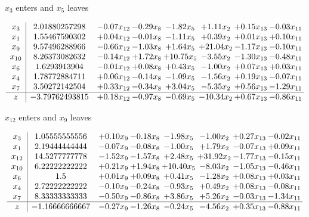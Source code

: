 \documentclass[9pt]{article}
\begin{document}
 $ x_{3} $ enters and $ x_{5} $ leaves 

 \[\begin{array}{c| c c@{\hskip 2pt} c@{\hskip 2pt} c@{\hskip 2pt} c@{\hskip 2pt} c@{\hskip 2pt} c@{\hskip 2pt} }
 x_{3}   &  2.01880257298 & -0.07 x_{12} & -0.29 x_{8} & -1.82 x_{5} & +  1.11 x_{2} & +  0.15 x_{13} & -0.03 x_{11}\\
 x_{1}   &  1.55467590302 & +  0.04 x_{12} & -0.01 x_{8} & -1.11 x_{5} & +  0.39 x_{2} & +  0.01 x_{13} & +  0.10 x_{11}\\
 x_{9}   &  9.57496288966 & -0.66 x_{12} & -1.03 x_{8} & +  1.64 x_{5} & + 21.04 x_{2} & -1.17 x_{13} & -0.10 x_{11}\\
 x_{10}   &  8.26373082632 & -0.14 x_{12} & +  1.72 x_{8} & + 10.75 x_{5} & -3.55 x_{2} & -1.30 x_{13} & -0.48 x_{11}\\
 x_{6}   &  1.6293913904 & -0.01 x_{12} & +  0.08 x_{8} & +  0.43 x_{5} & -1.00 x_{2} & +  0.07 x_{13} & +  0.03 x_{11}\\
 x_{4}   &  1.78772884711 & +  0.06 x_{12} & -0.14 x_{8} & -1.09 x_{5} & -1.56 x_{2} & +  0.19 x_{13} & -0.07 x_{11}\\
 x_{7}   &  3.50272142504 & +  0.33 x_{12} & -0.34 x_{8} & +  3.04 x_{5} & -5.35 x_{2} & +  0.56 x_{13} & -1.29 x_{11}\\
\hline
z    &  -3.79762493815 & +  0.18 x_{12} & -0.97 x_{8} & -0.69 x_{5} & -10.34 x_{2} & +  0.67 x_{13} & -0.86 x_{11}\\
\end{array}\]


 $ x_{12} $ enters and $ x_{9} $ leaves 

 \[\begin{array}{c| c c@{\hskip 2pt} c@{\hskip 2pt} c@{\hskip 2pt} c@{\hskip 2pt} c@{\hskip 2pt} c@{\hskip 2pt} }
 x_{3}   &  1.05555555556 & +  0.10 x_{9} & -0.18 x_{8} & -1.98 x_{5} & -1.00 x_{2} & +  0.27 x_{13} & -0.02 x_{11}\\
 x_{1}   &  2.19444444444 & -0.07 x_{9} & -0.08 x_{8} & -1.00 x_{5} & +  1.79 x_{2} & -0.07 x_{13} & +  0.09 x_{11}\\
 x_{12}   &  14.5277777778 & -1.52 x_{9} & -1.57 x_{8} & +  2.48 x_{5} & + 31.92 x_{2} & -1.77 x_{13} & -0.15 x_{11}\\
 x_{10}   &  6.22222222222 & +  0.21 x_{9} & +  1.94 x_{8} & + 10.40 x_{5} & -8.03 x_{2} & -1.05 x_{13} & -0.46 x_{11}\\
 x_{6}   &  1.5 & +  0.01 x_{9} & +  0.09 x_{8} & +  0.41 x_{5} & -1.28 x_{2} & +  0.08 x_{13} & +  0.03 x_{11}\\
 x_{4}   &  2.72222222222 & -0.10 x_{9} & -0.24 x_{8} & -0.93 x_{5} & +  0.49 x_{2} & +  0.08 x_{13} & -0.08 x_{11}\\
 x_{7}   &  8.33333333333 & -0.50 x_{9} & -0.86 x_{8} & +  3.86 x_{5} & +  5.26 x_{2} & -0.03 x_{13} & -1.34 x_{11}\\
\hline
z    &  -1.16666666667 & -0.27 x_{9} & -1.26 x_{8} & -0.24 x_{5} & -4.56 x_{2} & +  0.35 x_{13} & -0.88 x_{11}\\
\end{array}\]
\end{document}
